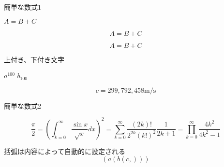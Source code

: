 \documentclass{jsarticle}
\begin{document}
簡単な数式1

$A = B + C$

\begin{equation}
A = B + C
\end{equation}

\[
A = B + C
\]

上付き、下付き文字

$a^{100}$ 
$b_{100}$

\begin{equation}
  c = 299{,}792{,}458  \mathrm{m/s}
\end{equation}


簡単な数式2

\begin{equation}
\frac{\pi}{2}=
\left(\int_{k=0}^{\infty}   \frac{\sin x}{\sqrt x} dx       \right)^2 = 
\sum_{k=0}^{\infty} \frac{(2k)!}{2^{2k}(k!)^2}  \frac{1}{2k+1} =
\prod_{k=0}^{\infty} \frac{4k^2}{4k^2-1}
\end{equation}


括弧は内容によって自動的に設定される
\[
\left(  a \left(b    \left(c, \right) \right) \right)
\]
\end{document}
